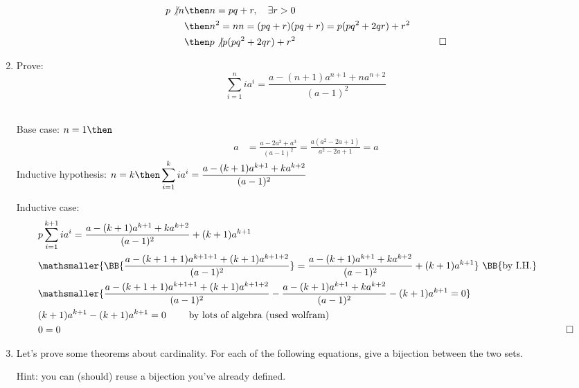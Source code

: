 \documentclass[basic, header]{nosvagor-notes}
\begin{document}
\begin{enumerate}[itemsep=4em]
    \begin{align*}
      p \not| n &\then n = pq + r, \quad \exists r > 0 \\
                &\then n^2 = nn = (pq+r)(pq+r) = p(pq^2 + 2qr) + r^2\\
                &\then p \not| p(pq^2 + 2qr) + r^2 & \qed \\
    \end{align*}

  \newpage %

  \item Prove:
    \[%
      \sum_{i=1}^{n} ia^i = \frac{a-(n+1)a^{n+1} + na^{n+2}}{(a-1)^2}
    \]%

    \\
    Base case: \(n = 1 \then\)
    \begin{align*}
     a &= \frac{a - 2a^2 + a^3}{(a-1)^2} = \frac{a(a^2 - 2a + 1)}{a^2 - 2a + 1} = a
    \end{align*}
    Inductive hypothesis: \(\displaystyle
    n=k
    \then
      \sum_{i=1}^{k} ia^i = \frac{a-(k+1)a^{k+1} + ka^{k+2}}{(a-1)^2}
     \)

    Inductive case:
    \begin{align*}
      &p\sum_{i=1}^{k+1} ia^i = \frac{a-(k+1)a^{k+1} + ka^{k+2}}{(a-1)^2} + (k+1)a^{k+1}\\
      &\mathsmaller{\BB{\frac{a-(k+1+1)a^{k+1+1} + (k+1)a^{k+1+2}}{(a-1)^2}} =
      \frac{a-(k+1)a^{k+1} + ka^{k+2}}{(a-1)^2} + (k+1)a^{k+1}}
      ~\text{\BB{by I.H.}} \\
      &\mathsmaller{\frac{a-(k+1+1)a^{k+1+1} + (k+1)a^{k+1+2}}{(a-1)^2} -
      \frac{a-(k+1)a^{k+1} + ka^{k+2}}{(a-1)^2} - (k+1)a^{k+1} = 0}\\
      &(k+1)a^{k+1}  - (k+1)a^{k+1} = 0 \qquad~\text{by lots of algebra (used wolfram)}\\
      &0 = 0 & \qed
    \end{align*}

  \vspace{-3em}
  \item Let’s prove some theorems about cardinality. For each of the following
    equations, give a bijection between the two sets.

    Hint: you can (should) reuse a bijection you've already defined.
    \begin{enumerate}[leftmargin=2em]


\end{enumerate}
\end{enumerate}
\end{document}

